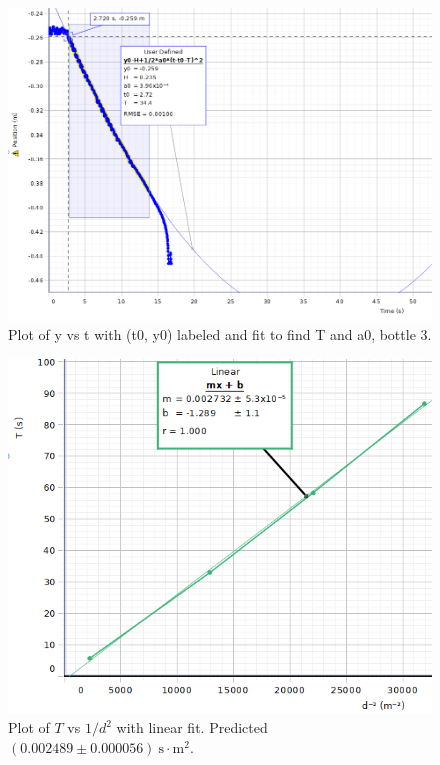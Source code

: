 \documentclass[12pt]{article}
\begin{document}
        \begin{figure}[H]
            \centering
            \includegraphics[width=0.9\linewidth]{y3.png}
            \captionsetup{justification=centering}
            \caption{Plot of y vs t with (t0, y0) labeled and fit to find T and a0, bottle 3.}
        \end{figure}
        \begin{figure}[H]
            \centering
            \includegraphics[width=0.9\linewidth]{fit1.png}
            \captionsetup{justification=centering}
            \caption{Plot of \(T\) vs \(1/d^2\) with linear fit. Predicted \((0.002489 \pm 0.000056) \mathrm{~s \cdot m^2}\).}
        \end{figure}
\end{document}
